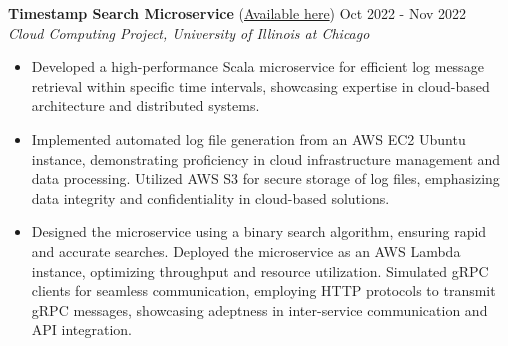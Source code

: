 
\noindent
\textbf{Timestamp Search Microservice} (\href{https://github.com/GiuseppeCalderonio/CS441_Homework2}{Available here}) \hfill Oct 2022 - Nov 2022 \\
\textit{Cloud Computing Project, University of Illinois at Chicago}
\begin{itemize}[noitemsep,topsep=0pt]
    \item Developed a high-performance Scala microservice for efficient log message retrieval within specific time intervals, showcasing expertise in cloud-based architecture and distributed systems.
    \item Implemented automated log file generation from an AWS EC2 Ubuntu instance, demonstrating proficiency in cloud infrastructure management and data processing. Utilized AWS S3 for secure storage of log files, emphasizing data integrity and confidentiality in cloud-based solutions.
    \item Designed the microservice using a binary search algorithm, ensuring rapid and accurate searches. Deployed the microservice as an AWS Lambda instance, optimizing throughput and resource utilization. Simulated gRPC clients for seamless communication, employing HTTP protocols to transmit gRPC messages, showcasing adeptness in inter-service communication and API integration.
\end{itemize}

\vspace{4pt}

